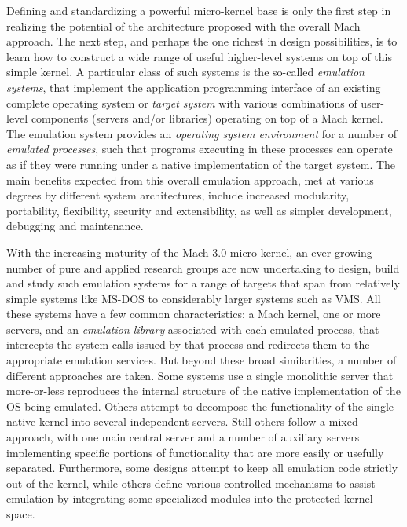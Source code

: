 Defining and standardizing a powerful micro-kernel base is only the
first step in realizing the potential of the architecture proposed
with the overall Mach approach. The next step, and perhaps the one
richest in design possibilities, is to learn how to construct a wide
range of useful higher-level systems on top of this simple kernel. A
particular class of such systems is the so-called {\em emulation
systems}, that implement the application programming interface of an
existing complete operating system or {\em target system} with various
combinations of user-level components (servers and/or libraries)
operating on top of a Mach kernel. The emulation system provides an
{\em operating system environment} for a number of {\em emulated
processes}, such that programs executing in these processes can
operate as if they were running under a native implementation of the
target system.  The main benefits expected from this overall emulation
approach, met at various degrees by different system architectures,
include increased modularity, portability, flexibility, security and
extensibility, as well as simpler development, debugging and
maintenance.

With the increasing maturity of the Mach 3.0 micro-kernel, an
ever-growing number of pure and applied research groups are now
undertaking to design, build and study such emulation systems for a
range of targets that span from relatively simple systems like MS-DOS
to considerably larger systems such as
VMS\cite{RASHID89,GOLUB90,TIS90,RASHID91}. All these systems have a
few common characteristics: a Mach kernel, one or more servers, and an
{\em emulation library} associated with each emulated process, that
intercepts the system calls issued by that process and redirects them
to the appropriate emulation services. But beyond these broad
similarities, a number of different approaches are taken.  Some
systems use a single monolithic server that more-or-less reproduces
the internal structure of the native implementation of the OS being
emulated.  Others attempt to decompose the functionality of the single
native kernel into several independent servers. Still others follow a
mixed approach, with one main central server and a number of auxiliary
servers implementing specific portions of functionality that are more
easily or usefully separated. Furthermore, some designs attempt to
keep all emulation code strictly out of the kernel, while others
define various controlled mechanisms to assist emulation by
integrating some specialized modules into the protected kernel space.

